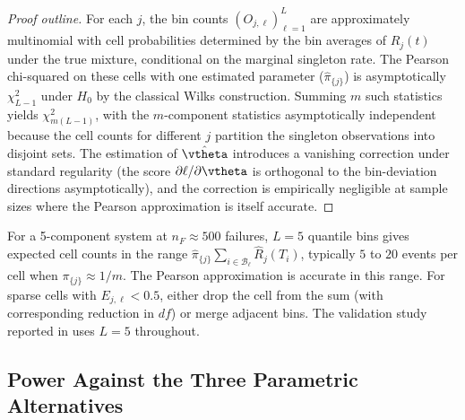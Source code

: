 \begin{proof}[Proof outline]
For each $j$, the bin counts $(O_{j, \ell})_{\ell=1}^{L}$ are approximately
multinomial with cell probabilities determined by the bin averages of
$R_j(t)$ under the true mixture, conditional on the marginal singleton
rate. The Pearson chi-squared on these cells with one estimated parameter
($\hat\pi_{\{j\}}$) is asymptotically $\chi^2_{L-1}$ under $H_0$ by the
classical Wilks construction. Summing $m$ such statistics yields
$\chi^2_{m(L-1)}$, with the $m$-component statistics asymptotically
independent because the cell counts for different $j$ partition the
singleton observations into disjoint sets. The estimation of $\hat\vtheta$
introduces a vanishing correction under standard regularity (the score
$\partial \ell / \partial \vtheta$ is orthogonal to the bin-deviation
directions asymptotically), and the correction is empirically negligible
at sample sizes where the Pearson approximation is itself accurate.
\end{proof}

\begin{remark}
\label{rem:choice-L}
For a 5-component system at $n_F \approx 500$ failures, $L = 5$ quantile
bins gives expected cell counts in the range $\hat\pi_{\{j\}}
\sum_{i \in \mathcal{B}_\ell} \hat R_j(T_i)$, typically $5$ to $20$
events per cell when $\pi_{\{j\}} \approx 1/m$. The Pearson approximation
is accurate in this range. For sparse cells with $E_{j,\ell} < 0.5$,
either drop the cell from the sum (with corresponding reduction in $df$)
or merge adjacent bins. The validation study reported in
 uses $L = 5$ throughout.
\end{remark}

\subsection{Power Against the Three Parametric Alternatives}
\label{sec:spec-test-power}

